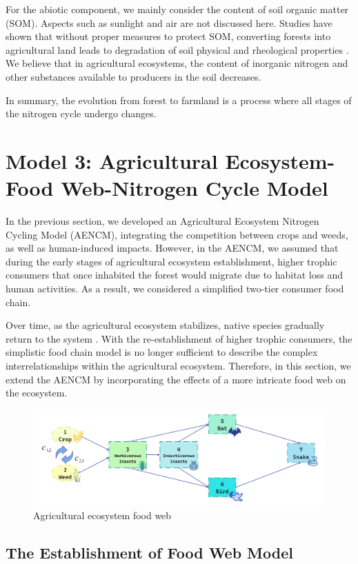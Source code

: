 \documentclass{mcmthesis}
\begin{document}
For the abiotic component, we mainly consider the content of soil organic matter (SOM). Aspects such as sunlight and air are not discussed here. Studies have shown that without proper measures to protect SOM, converting forests into agricultural land leads to degradation of soil physical and rheological properties \cite{SOW}. We believe that in agricultural ecosystems, the content of inorganic nitrogen and other substances available to producers in the soil decreases.  

In summary, the evolution from forest to farmland is a process where all stages of the nitrogen cycle undergo changes.

\section{Model 3: Agricultural Ecosystem-Food Web-Nitrogen Cycle Model}
In the previous section, we developed an Agricultural Ecosystem Nitrogen Cycling Model (AENCM), integrating the competition between crops and weeds, as well as human-induced impacts. However, in the AENCM, we assumed that during the early stages of agricultural ecosystem establishment, higher trophic consumers that once inhabited the forest would migrate due to habitat loss and human activities. As a result, we considered a simplified two-tier consumer food chain.

Over time, as the agricultural ecosystem stabilizes, native species gradually return to the system \cite{LAFEVOR201432}. With the re-establishment of higher trophic consumers, the simplistic food chain model is no longer sufficient to describe the complex interrelationships within the agricultural ecosystem. Therefore, in this section, we extend the AENCM by incorporating the effects of a more intricate food web on the ecosystem.
\begin{figure}[ht] 
\centering
\includegraphics[width=14cm]{figures/food web.jpg}
\caption{Agricultural ecosystem food web}
\label{fig:Agricultural_ecosystem_food_web}
\end{figure}
\subsection{The Establishment of Food Web Model}
\end{document}
